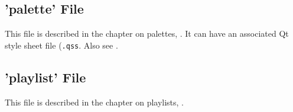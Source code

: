 \subsection{'palette' File}
\label{subsec:configuration_palette}

   This file is described in the chapter on palettes, .
   It can have an associated Qt style sheet file (\texttt{.qss}.
   Also see .

\subsection{'playlist' File}
\label{subsec:configuration_playlist}

   This file is described in the chapter on playlists, .

